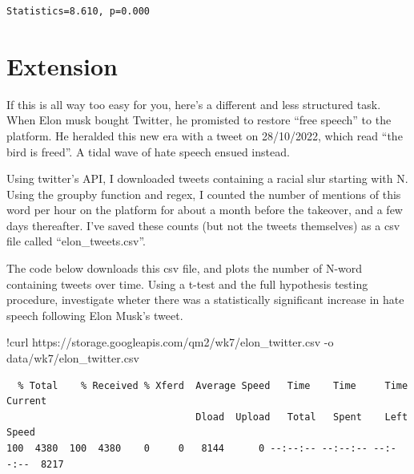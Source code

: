 \documentclass[
  letterpaper,
  DIV=11,
  numbers=noendperiod]{scrreprt}
\newenvironment{Shaded}{\begin{snugshade}}{\end{snugshade}}
\newcommand{\NormalTok}[1]{\textcolor[rgb]{0.00,0.23,0.31}{#1}}
\newcommand{\OperatorTok}[1]{\textcolor[rgb]{0.37,0.37,0.37}{#1}}
\begin{document}
\begin{Shaded}
\begin{Highlighting}[]

\end{Highlighting}
\end{Shaded}

\begin{verbatim}
Statistics=8.610, p=0.000
\end{verbatim}

\hypertarget{extension-3}{%
\section{Extension}\label{extension-3}}

If this is all way too easy for you, here's a different and less
structured task. When Elon musk bought Twitter, he promisted to restore
``free speech'' to the platform. He heralded this new era with a tweet
on 28/10/2022, which read ``the bird is freed''. A tidal wave of hate
speech ensued instead.

Using twitter's API, I downloaded tweets containing a racial slur
starting with N. Using the groupby function and regex, I counted the
number of mentions of this word per hour on the platform for about a
month before the takeover, and a few days thereafter. I've saved these
counts (but not the tweets themselves) as a csv file called
``elon\_tweets.csv''.

The code below downloads this csv file, and plots the number of N-word
containing tweets over time. Using a t-test and the full hypothesis
testing procedure, investigate wheter there was a statistically
significant increase in hate speech following Elon Musk's tweet.

\begin{Shaded}
\begin{Highlighting}[]
\OperatorTok{!}\NormalTok{curl https:}\OperatorTok{//}\NormalTok{storage.googleapis.com}\OperatorTok{/}\NormalTok{qm2}\OperatorTok{/}\NormalTok{wk7}\OperatorTok{/}\NormalTok{elon\_twitter.csv }\OperatorTok{{-}}\NormalTok{o data}\OperatorTok{/}\NormalTok{wk7}\OperatorTok{/}\NormalTok{elon\_twitter.csv}
\end{Highlighting}
\end{Shaded}

\begin{verbatim}
  % Total    % Received % Xferd  Average Speed   Time    Time     Time  Current
                                 Dload  Upload   Total   Spent    Left  Speed
100  4380  100  4380    0     0   8144      0 --:--:-- --:--:-- --:--:--  8217
\end{verbatim}
\end{document}

